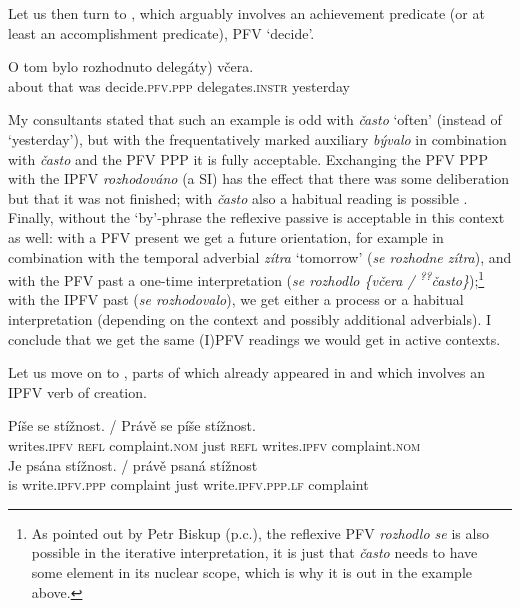\documentclass[output=paper,colorlinks,citecolor=brown]{langscibook}
\begin{document}
Let us then turn to , which arguably involves an achievement predicate (or at least an accomplishment predicate), PFV `decide'. 

\ea\label{ex:delegaty}
\gll O tom bylo rozhodnuto \minsp{(} delegáty) včera.\\
	about that was decide.\textsc{pfv.ppp} {} delegates.\textsc{instr} yesterday\\
\z 

\noindent My consultants stated that such an example is odd with \textit{často} `often' (instead of `yesterday'), but with the frequentatively marked auxiliary \textit{bývalo} in combination with \textit{často} and the PFV PPP it is fully acceptable. Exchanging the PFV PPP with the IPFV \textit{rozhodováno} (a SI) has the effect that there was some deliberation but that it was not finished; with \textit{často} also a habitual reading is possible%
. Finally, without the `by'-phrase the reflexive passive is acceptable in this context as well: with a PFV present we get a future orientation, for example in combination with the temporal adverbial \textit{zítra} `tomorrow' (\textit{se rozhodne zítra}), and with the PFV past a one-time interpretation (\textit{se rozhodlo \{včera / \textsuperscript{??}často\}});\footnote{As pointed out by Petr Biskup (p.c.), the reflexive PFV \textit{rozhodlo se} is also possible in the iterative interpretation, it is just that \textit{často} needs to have some element in its nuclear scope, which is why it is out in the example above.} with the IPFV past (\textit{se rozhodovalo}), we get either a process or a habitual interpretation (depending on the context and possibly additional adverbials). I conclude that we get the same (I)PFV readings we would get in active contexts.  

Let us move on to , parts of which already appeared in  and which involves an IPFV verb of creation.

\ea\label{ex:pisese}
\ea \label{ex:pisesea}
\gll Píše se stížnost. / Právě se píše stížnost.\\
	writes.\textsc{ipfv} \textsc{refl} complaint.\textsc{nom} {} just \textsc{refl} writes.\textsc{ipfv} complaint.\textsc{nom} \\
\ex\label{ex:piseseb}
\gll Je psána stížnost. / právě psaná stížnost\\
	is write.\textsc{ipfv.ppp} complaint {} just write.\textsc{ipfv.ppp.lf} complaint\\
	\z 
 \z 
 
\end{document}

